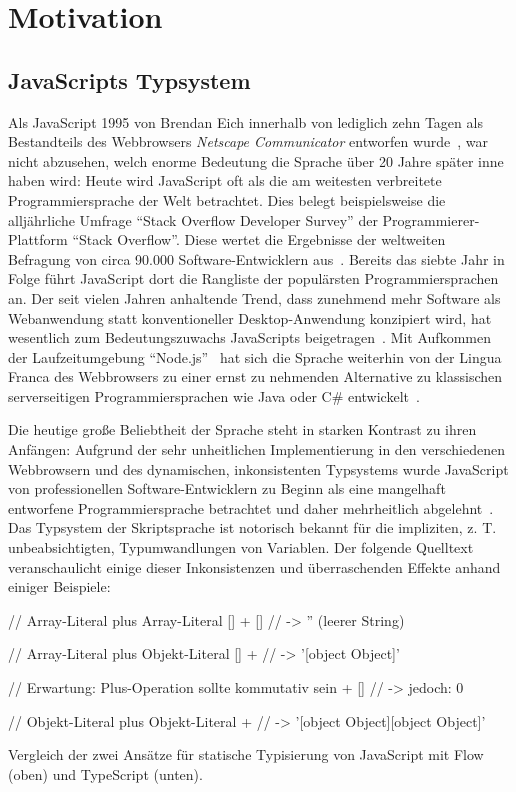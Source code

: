 \chapter{Motivation}

\section{JavaScripts Typsystem}

Als JavaScript 1995 von Brendan Eich innerhalb von lediglich zehn Tagen als Bestandteils des Webbrowsers \emph{Netscape Communicator} entworfen wurde~\autocite{severance:2012:js10days}, war nicht abzusehen, welch enorme Bedeutung die Sprache über 20 Jahre später inne haben wird: Heute wird JavaScript oft als die am weitesten verbreitete Programmiersprache der Welt betrachtet. Dies belegt beispielsweise die alljährliche Umfrage \enquote{Stack Overflow Developer Survey} der Programmierer-Plattform \enquote{Stack Overflow}. Diese wertet die Ergebnisse der weltweiten Befragung von circa 90.000 Software-Entwicklern aus~\autocite{stackoverflow:survey:2019}. Bereits das siebte Jahr in Folge führt JavaScript dort die Rangliste der populärsten Programmiersprachen an.
Der seit vielen Jahren anhaltende Trend, dass zunehmend mehr Software als Webanwendung statt konventioneller Desktop-Anwendung konzipiert wird, hat wesentlich zum Bedeutungszuwachs JavaScripts beigetragen~\autocite{taivalsaari:2017}\autocite{casteleyn:2014:ria}. Mit Aufkommen der Laufzeitumgebung \enquote{Node.js}~\autocite{nodejs} hat sich die Sprache weiterhin von der Lingua Franca des Webbrowsers zu einer ernst zu nehmenden Alternative zu klassischen serverseitigen Programmiersprachen wie Java oder C\# entwickelt~\autocite{tilkov:nodejs}.

Die heutige große Beliebtheit der Sprache steht in starken Kontrast zu ihren Anfängen: Aufgrund der sehr unheitlichen Implementierung in den verschiedenen Webbrowsern und des dynamischen, inkonsistenten Typsystems wurde JavaScript von professionellen Software-Entwicklern zu Beginn als eine mangelhaft entworfene Programmiersprache betrachtet und daher mehrheitlich abgelehnt~\autocite{oreilly:2001:js}. Das Typsystem der Skriptsprache ist notorisch bekannt für die impliziten, z. T. unbeabsichtigten, Typumwandlungen von Variablen. Der folgende Quelltext veranschaulicht einige dieser Inkonsistenzen und überraschenden Effekte anhand einiger Beispiele:

\bigskip
\begin{listing}[!h]
\begin{jscode}
// Array-Literal plus Array-Literal
[] + []  // -> '' (leerer String)

// Array-Literal plus Objekt-Literal
[] + {}  // -> '[object Object]'

// Erwartung: Plus-Operation sollte kommutativ sein
{} + []  // -> jedoch: 0

// Objekt-Literal plus Objekt-Literal
{} + {}  // -> '[object Object][object Object]'
\end{jscode}
\caption{Vergleich der zwei Ansätze für statische Typisierung von JavaScript mit Flow (oben) und TypeScript (unten).}
\label{code:example}
\end{listing}



